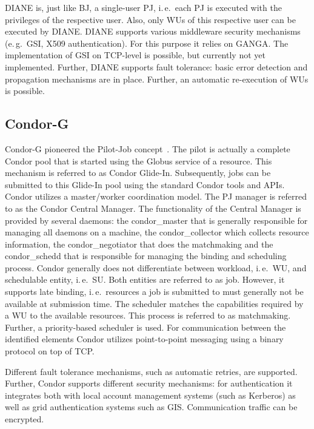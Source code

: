 \documentclass{sig-alternate}
\begin{document}
DIANE is, just like BJ, a single-user PJ, i.\,e.\ each PJ is executed with the
privileges of the respective user. Also, only WUs of this respective user can be
executed by DIANE. DIANE supports various middleware security mechanisms
(e.\,g.\ GSI, X509 authentication). For this purpose it relies on GANGA. The
implementation of GSI on TCP-level is possible, but currently not yet
implemented. Further, DIANE supports fault tolerance: basic error detection and
propagation mechanisms are in place. Further, an automatic re-execution of WUs
is possible.

\subsection{Condor-G}
Condor-G pioneered the Pilot-Job concept~\cite{condor-g}. The pilot is
actually a complete Condor pool that is started using the Globus
service of a resource. This mechanism is referred to as Condor
Glide-In. Subsequently, jobs can be submitted to this Glide-In pool
using the standard Condor tools and APIs. Condor utilizes a
master/worker coordination model. The PJ manager is referred to as the
Condor Central Manager. The functionality of the Central Manager is
provided by several daemons: the condor\_master that is generally
responsible for managing all daemons on a machine, the
condor\_collector which collects resource information, the
condor\_negotiator that does the matchmaking and the condor\_schedd
that is responsible for managing the binding and scheduling
process. Condor generally does not differentiate between workload,
i.\,e.\ WU, and schedulable entity, i.\,e.\ SU. Both entities are
referred to as job. However, it supports late binding, i.\,e.\
resources a job is submitted to must generally not be available at
submission time. The scheduler matches the capabilities required by a
WU to the available resources. This process is referred to as
matchmaking. Further, a priority-based scheduler is used. For
communication between the identified elements Condor utilizes
point-to-point messaging using a binary protocol on top of TCP.

Different fault tolerance mechanisms, such as automatic retries, are
supported.  Further, Condor supports different security mechanisms:
for authentication it integrates both with local account management
systems (such as Kerberos) as well as grid authentication systems such
as GIS. Communication traffic can be encrypted.
\end{document}
